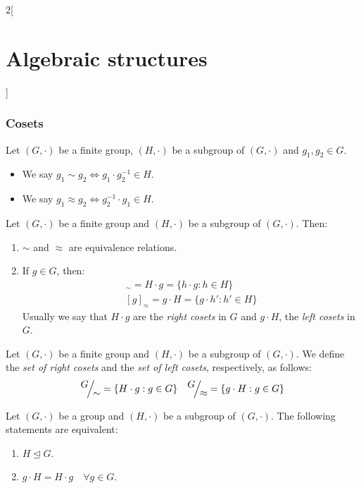 \documentclass[../../../main_math.tex]{subfiles}
\begin{document}
\begin{multicols}{2}[\section{Algebraic structures}]
  \subsubsection{Cosets}
  \begin{definition}\label{AS:equiv}
    Let $(G,\cdot)$ be a finite group, $(H,\cdot)$ be a subgroup of $(G,\cdot)$ and $g_1,g_2\in G$.
    \begin{itemize}
      \item We say $g_1\sim g_2\iff g_1\cdot g_2^{-1}\in H$.
      \item We say $g_1\approx g_2\iff g_2^{-1}\cdot g_1\in H$.
    \end{itemize}
  \end{definition}
  \begin{lemma}
    Let $(G,\cdot)$ be a finite group and $(H,\cdot)$ be a subgroup of $(G,\cdot)$. Then:
    \begin{enumerate}
      \item $\sim$ and $\approx$ are equivalence relations.
      \item If $g\in G$, then:
            \begin{gather*}
              [g]_\sim=H\cdot g=\{h\cdot g:h\in H\}\\ [g]_\approx=g\cdot H=\{g\cdot h':h'\in H\}
            \end{gather*}
            Usually we say that $H\cdot g$ are the \emph{right cosets} in $G$ and $g\cdot H$, the \emph{left cosets} in $G$.
    \end{enumerate}
  \end{lemma}
  \begin{definition}
    Let $(G,\cdot)$ be a finite group and $(H,\cdot)$ be a subgroup of $(G,\cdot)$. We define the \emph{set of right cosets} and the \emph{set of left cosets}, respectively, as follows:
    $$\quot{G}{\sim}=\{H\cdot g:g\in G\}\quad\quot{G}{\approx}=\{g\cdot H:g\in G\}$$
  \end{definition}
  \begin{proposition}
    Let $(G,\cdot)$ be a group and $(H,\cdot)$ be a subgroup of $(G,\cdot)$. The following statements are equivalent:
    \begin{enumerate}
      \item $H\unlhd G$.
      \item $g\cdot H=H\cdot g\quad\forall g\in G$.
    \end{enumerate}
  \end{proposition}
  \begin{theorem}\label{AS:lagrange}

\end{theorem}
\end{multicols}
\end{document}
